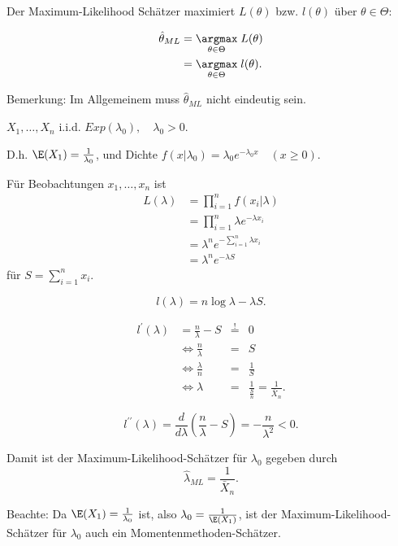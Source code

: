 \documentclass{tstextbook}
\begin{document}
Der Maximum-Likelihood Schätzer maximiert $ L(\theta) $ bzw. $ l(\theta) $ über $ \theta\in\Theta $: 

\[
\begin{aligned}
	\hat{\theta}_{ML} & = \underset{\theta\in\Theta}{\argmax}\; L(\theta) \\
	& = \underset{\theta\in\Theta}{\argmax}\; l(\theta) .
\end{aligned}
\]

\begin{remark}
	Bemerkung: Im Allgemeinem muss $ \hat{\theta}_{ML} $ nicht eindeutig sein.
\end{remark} 

\begin{example}[Exponentialverteilung]
	$ X_1,\ldots,X_n $ i.i.d. $ Exp(\lambda_0), \quad \lambda_0 >0 $. 
	
	D.h. $ \E(X_1)=\frac{1}{\lambda_0} $, und Dichte $ f(x|\lambda_0) = \lambda_0 e^{-\lambda_0 x} \quad (x\ge0) $.
	
	Für Beobachtungen $ x_1,\ldots,x_n $ ist 
	\[
	\begin{aligned}
		L(\lambda) & = \prod_{i=1}^{n} f(x_i|\lambda) \\
		& = \prod_{i=1}^{n} \lambda e^{-\lambda x_i} \\
		& = \lambda^n e^{-\sum_{i=1}^{n}\lambda x_i} \\
		& = \lambda^n e^{-\lambda S}
	\end{aligned}
	\]
	für $ S = \sum_{i=1}^{n} x_i $.
	
	\[
	l(\lambda) = n \log \lambda - \lambda S.
	\]
	
	\[
	\begin{aligned}
		l^\prime (\lambda) & = \frac{n}{\lambda} - S &  \overset{!}{=} & 0 \\
		& \Leftrightarrow \frac{n}{\lambda} & = & S \\
		& \Leftrightarrow \frac{\lambda}{n} & = & \frac{1}{S} \\
		& \Leftrightarrow \lambda & = & \frac{1}{\frac{S}{n}} = \frac{1}{\bar{X}_n}.
	\end{aligned}
	\]
	
	\[
	l^{\prime\prime} (\lambda) = \frac{d}{d\lambda} \left(\frac{n}{\lambda} - S \right) = - \frac{n}{\lambda^2} < 0.
	\]
	
	Damit ist der Maximum-Likelihood-Schätzer für $ \lambda_0 $ gegeben durch 
	\[
	\hat{\lambda}_{ML} = \frac{1}{\bar{X}_n}.
	\]
\end{example}

\begin{remark}
	Beachte: Da $ \E(X_1)=\frac{1}{\lambda_0} $ ist, also $ \lambda_0 = \frac{1}{\E(X_1)} $, ist der Maximum-Likelihood-Schätzer für $ \lambda_0 $ auch ein Momentenmethoden-Schätzer.
\end{remark}
\end{document}
